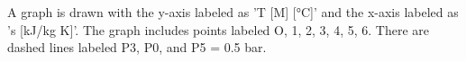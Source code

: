A graph is drawn with the y-axis labeled as 'T [M] [°C]' and the x-axis labeled as 's [kJ/kg K]'. The graph includes points labeled O, 1, 2, 3, 4, 5, 6. There are dashed lines labeled P3, P0, and P5 = 0.5 bar.
